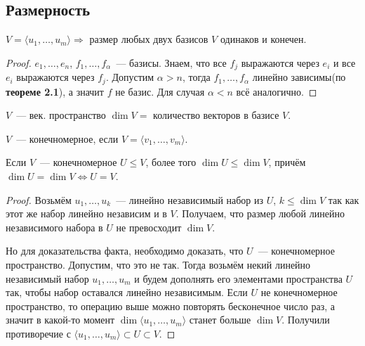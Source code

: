 \subsection{Размерность}
\begin{theorem}
    $V = \langle u_1,\dots,u_m\rangle \Rightarrow$ размер любых двух базисов $V$ одинаков и конечен.
\end{theorem}
\begin{proof}
    $e_1,\dots,e_n$, $f_1,\dots,f_\alpha$~--- базисы. Знаем, что все $f_j$
    выражаются через $e_i$ и все $e_i$ выражаются через $f_j$.
    Допустим $\alpha > n$, тогда $f_1,\dots,f_\alpha$ линейно зависимы(по \textbf{теореме 2.1}), а значит $f$ не базис.
    Для случая $\alpha < n$ всё аналогично.
\end{proof}
\begin{definition}
    $V$~--- век. пространство $\dim V =$ количество векторов в базисе $V$.
\end{definition}
\begin{definition}
    $V$~--- конечномерное, если $V = \langle v_1,\dots, v_m\rangle$.
\end{definition}
\begin{lemma}
    Если $V$~--- конечномерное $U \leq V$, более того $\dim U \leq \dim V$, причём $\dim U = \dim V \Leftrightarrow U=V$.
\end{lemma}
\begin{proof}
    Возьмём $u_1,\dots,u_k$~--- линейно независимый набор из $U$, $k\leq \dim V$ так как этот же набор линейно независим и в $V$. 
    Получаем, что размер любой линейно независимого набора в $U$ не превосходит $\dim V$.

    Но для доказательства факта, необходимо доказать, что $U$~--- конечномерное пространство. Допустим, что это не так.
    Тогда возьмём некий линейно независимый набор $u_1,\dots, u_m$ и будем дополнять его элементами пространства $U$ так, чтобы набор оставался линейно независимым.
    Если $U$ не конечномерное пространство, то операцию выше можно повторять бесконечное число раз,
    а значит в какой-то момент $\dim\langle u_1, \dots, u_m\rangle$ станет больше $\dim V$. 
    Получили противоречие с $\langle u_1, \dots, u_m\rangle \subset U \subset V$.
\end{proof}

